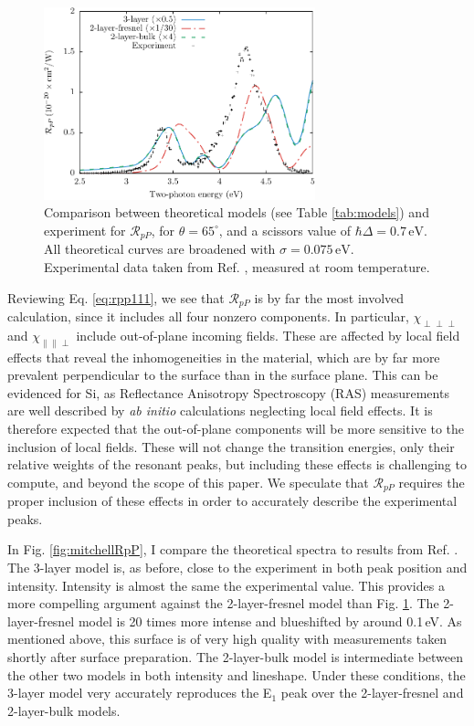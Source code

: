\begin{figure}
\centering 
\includegraphics[width=0.7\textwidth]{content/figures/fig-4_4_05}
\caption{Comparison between theoretical models (see Table \ref{tab:models}) and
experiment for $\mathcal{R}_{pP}$, for $\theta=65^{\circ}$, and a scissors
value of $\hbar\Delta = 0.7\,\text{eV}$. All theoretical curves are broadened
with $\sigma=0.075\,\text{eV}$. Experimental data taken from Ref.
\cite{mejiaPRB02}, measured at room temperature.}
\label{fig:RpP}
\end{figure}

Reviewing Eq. \eqref{eq:rpp111}, we see that $\mathcal{R}_{pP}$ is by far the most involved calculation, since it includes all four nonzero components. In particular, $\chi_{\perp\perp\perp}$ and $\chi_{\parallel\parallel\perp}$ include out-of-plane incoming fields. These are affected by local field effects\cite{tancognedejean:tel-01235611} that reveal the inhomogeneities in the material, which are by far more prevalent perpendicular to the surface than in the surface plane. This can be evidenced for Si, as Reflectance Anisotropy Spectroscopy (RAS) measurements are well described by \emph{ab initio} calculations neglecting local field effects.\cite{palummoPRB99, gaalPRB09} It is therefore expected that the out-of-plane components will be more sensitive to the inclusion of local fields. These will not change the transition energies, only their relative weights of the resonant peaks,\cite{tancognedejean:tel-01235611} but including these effects is challenging to compute,\cite{nicolasPRB15} and beyond the scope of this paper. We speculate that $\mathcal{R}_{pP}$ requires the proper inclusion of these effects in order to accurately describe the experimental peaks.

In Fig. \ref{fig:mitchellRpP}, I compare the theoretical spectra to results from
Ref. \cite{mitchellSS01}. The 3-layer model is, as before, close to the
experiment in both peak position and intensity. Intensity is almost the same the
experimental value. This provides a more compelling argument against the
2-layer-fresnel model than Fig. \ref{fig:RpP}. The 2-layer-fresnel model is 20
times more intense and blueshifted by around 0.1\,eV. As mentioned above, this
surface is of very high quality with measurements taken shortly after surface
preparation. The 2-layer-bulk model is intermediate between the other two models
in both intensity and lineshape. Under these conditions, the 3-layer model very
accurately reproduces the E$_{1}$ peak over the 2-layer-fresnel and 2-layer-bulk
models.

